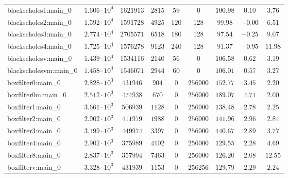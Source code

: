 \begin{tabular}{|l|c|c|c|c|c|c|c|c|}
blackscholes1:main\_0          & $ 1.606 \cdot 10^{4} $ & $ 1621913  $ & $ 2815   $ & $ 59   $ & $ 0        $ & $ 100.98      $ & $ 0.10    $ & $ 3.76    $ \\
blackscholes2:main\_0          & $ 1.592 \cdot 10^{4} $ & $ 1591728  $ & $ 4925   $ & $ 120  $ & $ 128      $ & $ 99.98       $ & $ -0.00   $ & $ 6.51    $ \\
blackscholes3:main\_0          & $ 2.774 \cdot 10^{4} $ & $ 2705571  $ & $ 6518   $ & $ 180  $ & $ 128      $ & $ 97.54       $ & $ -0.25   $ & $ 9.07    $ \\
blackscholes4:main\_0          & $ 1.725 \cdot 10^{4} $ & $ 1576278  $ & $ 9123   $ & $ 240  $ & $ 128      $ & $ 91.37       $ & $ -0.95   $ & $ 11.98   $ \\
blackscholesv:main\_0          & $ 1.439 \cdot 10^{4} $ & $ 1534116  $ & $ 2140   $ & $ 56   $ & $ 0        $ & $ 106.58      $ & $ 0.62    $ & $ 3.19    $ \\
blackscholesvm:main\_0         & $ 1.458 \cdot 10^{4} $ & $ 1546071  $ & $ 2944   $ & $ 60   $ & $ 0        $ & $ 106.01      $ & $ 0.57    $ & $ 3.27    $ \\
boxfilter0:main\_0             & $ 2.828 \cdot 10^{3} $ & $ 431946   $ & $ 904    $ & $ 0    $ & $ 256000   $ & $ 152.77      $ & $ 3.45    $ & $ 2.20    $ \\
boxfilter0m:main\_0            & $ 2.512 \cdot 10^{3} $ & $ 474938   $ & $ 670    $ & $ 0    $ & $ 256000   $ & $ 189.07      $ & $ 4.71    $ & $ 2.00    $ \\
boxfilter1:main\_0             & $ 3.661 \cdot 10^{3} $ & $ 506939   $ & $ 1128   $ & $ 0    $ & $ 256000   $ & $ 138.48      $ & $ 2.78    $ & $ 2.25    $ \\
boxfilter2:main\_0             & $ 2.902 \cdot 10^{3} $ & $ 411979   $ & $ 1988   $ & $ 0    $ & $ 256000   $ & $ 141.96      $ & $ 2.96    $ & $ 2.84    $ \\
boxfilter3:main\_0             & $ 3.199 \cdot 10^{3} $ & $ 449974   $ & $ 3397   $ & $ 0    $ & $ 256000   $ & $ 140.67      $ & $ 2.89    $ & $ 3.77    $ \\
boxfilter4:main\_0             & $ 2.902 \cdot 10^{3} $ & $ 375989   $ & $ 4102   $ & $ 0    $ & $ 256000   $ & $ 129.55      $ & $ 2.28    $ & $ 4.69    $ \\
boxfilter8:main\_0             & $ 2.837 \cdot 10^{3} $ & $ 357994   $ & $ 7463   $ & $ 0    $ & $ 256000   $ & $ 126.20      $ & $ 2.08    $ & $ 12.55   $ \\
boxfilterv:main\_0             & $ 3.328 \cdot 10^{3} $ & $ 431939   $ & $ 1153   $ & $ 0    $ & $ 256256   $ & $ 129.79      $ & $ 2.29    $ & $ 2.24    $ \\

\end{tabular}
